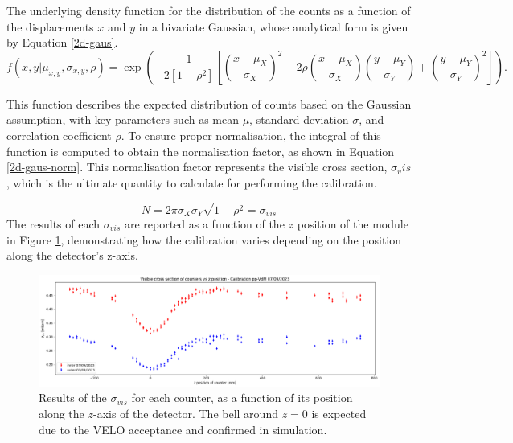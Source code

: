 The underlying density function for the distribution of the counts as a function of the displacements $x$ and $y$ in a bivariate Gaussian, whose analytical form is given by Equation \eqref{2d-gaus}. 
\begin{equation}
    f(x,y|\mu_{x,y},\sigma_{x,y},\rho)=\exp{\left(-{\frac {1}{2\left[1-\rho ^{2}\right]}}\left[\left({\frac {x-\mu _{X}}{\sigma _{X}}}\right)^{2}-2\rho \left({\frac {x-\mu _{X}}{\sigma _{X}}}\right)\left({\frac {y-\mu _{Y}}{\sigma _{Y}}}\right)+\left({\frac {y-\mu _{Y}}{\sigma _{Y}}}\right)^{2}\right]\right)}\label{2d-gaus}.
\end{equation}

This function describes the expected distribution of counts based on the Gaussian assumption, with key parameters such as mean $\mu$, standard deviation $\sigma$, and correlation coefficient $\rho$. To ensure proper normalisation, the integral of this function is computed to obtain the normalisation factor, as shown in Equation \eqref{2d-gaus-norm}. This normalisation factor represents the visible cross section, $\sigma_vis$, which is the ultimate quantity to calculate for performing the calibration.

\begin{equation}
    N = 2\pi \sigma_{X}\sigma_{Y}\sqrt {1-\rho ^{2}}=\sigma_{vis}\label{2d-gaus-norm}
\end{equation}
 The results of each $\sigma_{vis}$ are reported as a function of the $z$ position of the module in Figure \ref{fig:coefficient_pos}, demonstrating how the calibration varies depending on the position along the detector's z-axis.

\begin{figure}
    \centering
    \includegraphics[width=\textwidth]{figures/coefficient_pos.png}
    \caption{Results of the $\sigma_{vis}$ for each counter, as a function of its position along the $z$-axis of the detector. The bell around $z=0$ is expected due to the VELO acceptance and confirmed in simulation.}
    \label{fig:coefficient_pos}
\end{figure}


